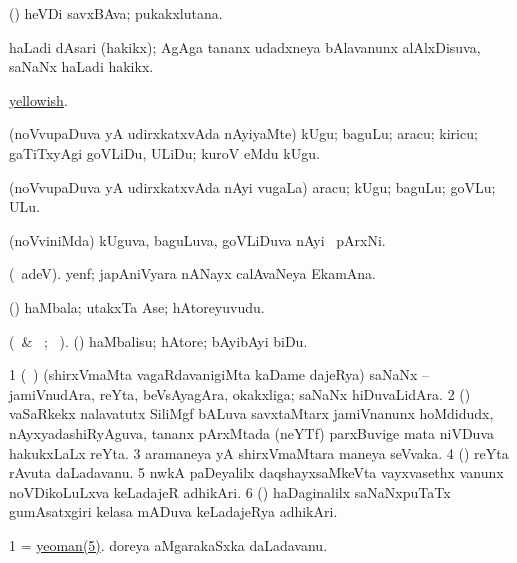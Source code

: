 \bentry
{}
\gl{\nA} 
\bmng
(\AmA) 
heVDi savxBAva; pukakxlutana.
\emng
\eentry

\bentry
{}
\gl{\nA} 
\bmng
haLadi dAsari (hakikx); AgAga tananx udadxneya bAlavanunx alAlxDisuva, saNaNx haLadi hakikx.
\emng
\eentry

\bentry
{} 
\gl{\gu} 
\bmng
\hyperlink{yellowish}{yellowish}.
\emng 
\eentry

\bentry
{} 
\gl{\akirx} 
\bmng
(noVvupaDuva yA udirxkatxvAda  nAyiyaMte) kUgu; baguLu; aracu; kiricu; gaTiTxyAgi goVLiDu, ULiDu; kuroV eMdu kUgu.
\emng
\eentry

\bentry
{} 
\gl{\nA} 
\bmng
(noVvupaDuva yA udirxkatxvAda nAyi \mo vugaLa) aracu; kUgu; baguLu; goVLu; ULu.
\emng
\eentry

\bentry
{} 
\gl{\nA} 
\bmng
(noVviniMda) kUguva, baguLuva, goVLiDuva nAyi \mo\ pArxNi.
\emng
\eentry

\bentry
{} 
\gl{\nA} 
\bmng
(\bava\ adeV).
yenf; japAniVyara nANayx calAvaNeya EkamAna.
\emng
\eentry

\bentry
{} 
\gl{\nA} 
\bmng
(\AmA) haMbala; utakxTa Ase; hAtoreyuvudu.
\emng
\eentry

\bentry
{} 
\gl{\akirx} 
\bmng
(\BU\ \& \BUkaq\ ; \vakaq\ ).
(\AmA) haMbalisu; hAtore; bAyibAyi biDu.
\emng 
\eentry

\bentry
{} 
\gl{\nA} 
\bmng
\bnum
\num{1} (\kanmu\ \ca) (shirxVmaMta vagaRdavanigiMta kaDame dajeRya) saNaNx -- jamiVnudAra, reYta, beVsAyagAra, okakxliga; saNaNx hiDuvaLidAra. 
\num{2} (\ca) vaSaRkekx nalavatutx SiliMgf bALuva savxtaMtarx jamiVnanunx hoMdidudx, nAyxyadashiRyAguva, tananx pArxMtada (neYTf) parxBuvige mata niVDuva hakukxLaLx reYta.  
\num{3} aramaneya yA shirxVmaMtara maneya seVvaka. 
\num{4} (\birx) reYta rAvuta daLadavanu. 
\hypertarget{yeoman(5)}{}
\num{5} nwkA paDeyalilx daqshayxsaMkeVta vayxvasethx \mo vanunx noVDikoLuLxva keLadajeR adhikAri. 
\num{6} (\ame) haDaginalilx saNaNxpuTaTx gumAsatxgiri kelasa mADuva keLadajeRya adhikAri.
\enum
\emng

\noindent                          
\gl{\pagu} 
\bmng
\bnum
\num{1}  =  \hyperlink{yeoman(5)}{yeoman(5)}.  
  
\banum
{} doreya aMgarakaSxka daLadavanu. 

